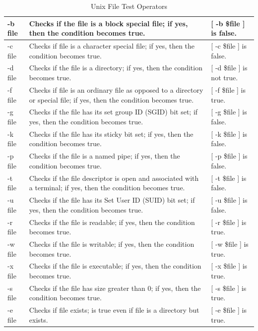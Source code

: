 \documentclass[11pt]{article}
\begin{document}
\begin{table}[htbp]
    \centering
    \caption*{Unix File Test Operators}
    \begin{tabularx}{\textwidth}{|l|X|l|}
        \hline
        -b file & Checks if the file is a block special file; if yes, then the condition becomes true. & [ -b \$file ] is false. \\ \hline
        -c file & Checks if file is a character special file; if yes, then the condition becomes true. & [ -c \$file ] is false. \\ \hline
        -d file & Checks if the file is a directory; if yes, then the condition becomes true. & [ -d \$file ] is not true. \\ \hline
        -f file & Checks if file is an ordinary file as opposed to a directory or special file; if yes, then the condition becomes true. & [ -f \$file ] is true. \\ \hline
        -g file & Checks if the file has its set group ID (SGID) bit set; if yes, then the condition becomes true. & [ -g \$file ] is false. \\ \hline
        -k file & Checks if the file has its sticky bit set; if yes, then the condition becomes true. & [ -k \$file ] is false. \\ \hline
        -p file & Checks if the file is a named pipe; if yes, then the condition becomes true. & [ -p \$file ] is false. \\ \hline
        -t file & Checks if the file descriptor is open and associated with a terminal; if yes, then the condition becomes true. & [ -t \$file ] is false. \\ \hline
        -u file & Checks if the file has its Set User ID (SUID) bit set; if yes, then the condition becomes true. & [ -u \$file ] is false. \\ \hline
        -r file & Checks if the file is readable; if yes, then the condition becomes true. & [ -r \$file ] is true. \\ \hline
        -w file & Checks if the file is writable; if yes, then the condition becomes true. & [ -w \$file ] is true. \\ \hline
        -x file & Checks if the file is executable; if yes, then the condition becomes true. & [ -x \$file ] is true. \\ \hline
        -s file & Checks if the file has size greater than 0; if yes, then the condition becomes true. & [ -s \$file ] is true. \\ \hline
        -e file & Checks if file exists; is true even if file is a directory but exists. & [ -e \$file ] is true. \\ 
        \hline
    \end{tabularx}
\end{table}
\end{document}
